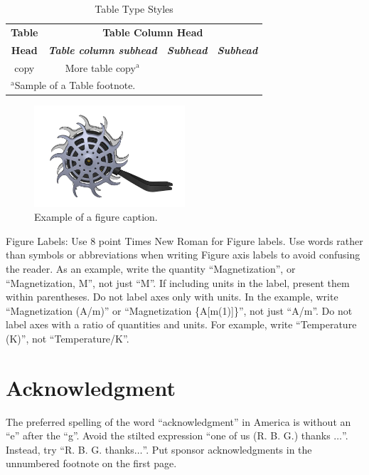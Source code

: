 \documentclass[conference]{IEEEtran}
\begin{document}
\begin{table}[htbp]
\caption{Table Type Styles}
\begin{center}
\begin{tabular}{|c|c|c|c|}
\hline
\textbf{Table}&\multicolumn{3}{|c|}{\textbf{Table Column Head}} \\
\cline{2-4} 
\textbf{Head} & \textbf{\textit{Table column subhead}}& \textbf{\textit{Subhead}}& \textbf{\textit{Subhead}} \\
\hline
copy& More table copy$^{\mathrm{a}}$& &  \\
\hline
\multicolumn{4}{l}{$^{\mathrm{a}}$Sample of a Table footnote.}
\end{tabular}
\label{tab1}
\end{center}
\end{table}

\begin{figure}[htbp]
\centerline{\includegraphics[width=0.5\textwidth]{Fig_T2.png}}
\caption{Example of a figure caption.}
\label{fig}
\end{figure}

Figure Labels: Use 8 point Times New Roman for Figure labels. Use words 
rather than symbols or abbreviations when writing Figure axis labels to 
avoid confusing the reader. As an example, write the quantity 
``Magnetization'', or ``Magnetization, M'', not just ``M''. If including 
units in the label, present them within parentheses. Do not label axes only 
with units. In the example, write ``Magnetization (A/m)'' or ``Magnetization 
\{A[m(1)]\}'', not just ``A/m''. Do not label axes with a ratio of 
quantities and units. For example, write ``Temperature (K)'', not 
``Temperature/K''.

\section*{Acknowledgment}

The preferred spelling of the word ``acknowledgment'' in America is without 
an ``e'' after the ``g''. Avoid the stilted expression ``one of us (R. B. 
G.) thanks $\ldots$''. Instead, try ``R. B. G. thanks$\ldots$''. Put sponsor 
acknowledgments in the unnumbered footnote on the first page.
\end{document}
